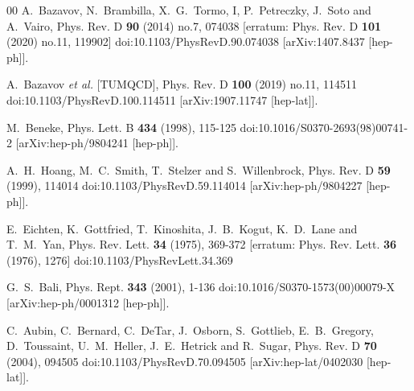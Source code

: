 \documentclass[preprint,12pt]{elsarticle}
\begin{document}
\begin{thebibliography}{00}
A.~Bazavov, N.~Brambilla, X.~G.~Tormo, I, P.~Petreczky, J.~Soto and A.~Vairo,
Phys. Rev. D \textbf{90} (2014) no.7, 074038
[erratum: Phys. Rev. D \textbf{101} (2020) no.11, 119902]
doi:10.1103/PhysRevD.90.074038
[arXiv:1407.8437 [hep-ph]].

A.~Bazavov \textit{et al.} [TUMQCD],
Phys. Rev. D \textbf{100} (2019) no.11, 114511
doi:10.1103/PhysRevD.100.114511
[arXiv:1907.11747 [hep-lat]].

M.~Beneke,
Phys. Lett. B \textbf{434} (1998), 115-125
doi:10.1016/S0370-2693(98)00741-2
[arXiv:hep-ph/9804241 [hep-ph]].

A.~H.~Hoang, M.~C.~Smith, T.~Stelzer and S.~Willenbrock,
Phys. Rev. D \textbf{59} (1999), 114014
doi:10.1103/PhysRevD.59.114014
[arXiv:hep-ph/9804227 [hep-ph]].

E.~Eichten, K.~Gottfried, T.~Kinoshita, J.~B.~Kogut, K.~D.~Lane and T.~M.~Yan,
Phys. Rev. Lett. \textbf{34} (1975), 369-372
[erratum: Phys. Rev. Lett. \textbf{36} (1976), 1276]
doi:10.1103/PhysRevLett.34.369

G.~S.~Bali,
Phys. Rept. \textbf{343} (2001), 1-136
doi:10.1016/S0370-1573(00)00079-X
[arXiv:hep-ph/0001312 [hep-ph]].

C.~Aubin, C.~Bernard, C.~DeTar, J.~Osborn, S.~Gottlieb, E.~B.~Gregory, D.~Toussaint, U.~M.~Heller, J.~E.~Hetrick and R.~Sugar,
Phys. Rev. D \textbf{70} (2004), 094505
doi:10.1103/PhysRevD.70.094505
[arXiv:hep-lat/0402030 [hep-lat]].


\end{thebibliography}
\end{document}

